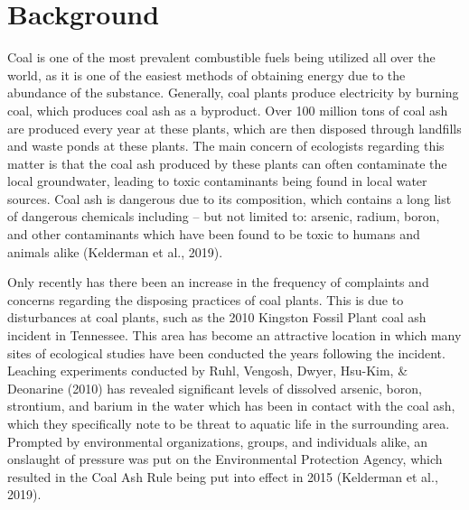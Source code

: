\documentclass[12pt, twoside]{amherstthesis}
\begin{document}
\hypertarget{background}{%
\section{Background}\label{background}}

Coal is one of the most prevalent combustible fuels being utilized all over the world, as it is one of the easiest methods of obtaining energy due to the abundance of the substance. Generally, coal plants produce electricity by burning coal, which produces coal ash as a byproduct. Over 100 million tons of coal ash are produced every year at these plants, which are then disposed through landfills and waste ponds at these plants. The main concern of ecologists regarding this matter is that the coal ash produced by these plants can often contaminate the local groundwater, leading to toxic contaminants being found in local water sources. Coal ash is dangerous due to its composition, which contains a long list of dangerous chemicals including -- but not limited to: arsenic, radium, boron, and other contaminants which have been found to be toxic to humans and animals alike (Kelderman et al., 2019).

Only recently has there been an increase in the frequency of complaints and concerns regarding the disposing practices of coal plants. This is due to disturbances at coal plants, such as the 2010 Kingston Fossil Plant coal ash incident in Tennessee. This area has become an attractive location in which many sites of ecological studies have been conducted the years following the incident. Leaching experiments conducted by Ruhl, Vengosh, Dwyer, Hsu-Kim, \& Deonarine (2010) has revealed significant levels of dissolved arsenic, boron, strontium, and barium in the water which has been in contact with the coal ash, which they specifically note to be threat to aquatic life in the surrounding area. Prompted by environmental organizations, groups, and individuals alike, an onslaught of pressure was put on the Environmental Protection Agency, which resulted in the Coal Ash Rule being put into effect in 2015 (Kelderman et al., 2019).
\end{document}

